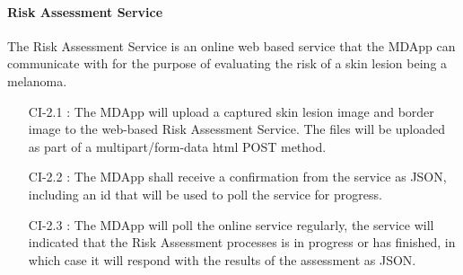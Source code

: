    \paragraph{Risk Assessment Service }

        The Risk Assessment Service is an online web based service that the MDApp can communicate with for the purpose of evaluating the risk of a skin lesion being a melanoma.

        \begin{itemize}[leftmargin=1.4cm]
            \item[CI-2.1 :] The MDApp will upload a captured skin lesion image and border image to the web-based Risk Assessment Service. The files will be uploaded as part of a multipart/form-data html POST method.
            \item[CI-2.2 :] The MDApp shall receive a confirmation from the service as JSON, including an id that will be used to poll the service for progress.
            \item[CI-2.3 :] The MDApp will poll the online service regularly, the service will indicated that the Risk Assessment processes is in progress or has finished, in which case it will respond with the results of the assessment as JSON.

        \end{itemize}